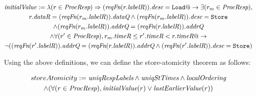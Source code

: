 \begin{defn}
\small
\begin{multline*}
\textit{initialValue} := \lambda (r \in \textit{ProcResp}) \Rightarrow
(\textit{reqFn} (r.\textit{labelR})).\textit{desc} = \texttt{Load} @->
\exists (r_m \in \textit{ProcResp}),\\ r.\textit{dataR} = (\textit{reqFn} (r_m.\textit{labelR})).\textit{dataQ} \wedge 
(\textit{reqFn} (r_m.\textit{labelR})).\textit{desc} = \texttt{Store} \\ \wedge (\textit{reqFn} (r_m.\textit{labelR})).\textit{addrQ} = (\textit{reqFn} (r.\textit{labelR})).\textit{addrQ}\\ \wedge
\forall (r' \in \textit{ProcResp}), r_m.\textit{timeR} \le r'.\textit{timeR} < r.\textit{timeR} @->\\
\neg ((\textit{reqFn} (r'.\textit{labelR})).\textit{addrQ} = (\textit{reqFn} (r.\textit{labelR})).\textit{addrQ} \wedge (\textit{reqFn} (r'.\textit{labelR})).\textit{desc} = \texttt{Store})
\end{multline*}
\end{defn}

Using the above definitions, we can define the store-atomicity theorem as follows:
\begin{thm}
\small
\begin{multline*}
storeAtomicity := 
\textit{uniqRespLabels} \wedge
\textit{uniqStTimes} \wedge \textit{localOrdering}\\ \wedge 
(\forall (r \in \textit{ProcResp}), \textit{initialValue}(r) \vee \textit{lastEarlierValue}(r))
\end{multline*}
\end{thm}
